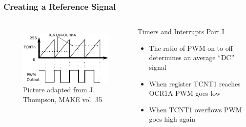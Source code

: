 \documentclass{beamer}
\begin{document}
\begin{frame}
\frametitle{Creating a Reference Signal}
\begin{columns}[t]
	\column[c]{6cm}
	\begin{figure}
	    \includegraphics[scale=1.25]{Bitbang}\\
	    \tiny{ Picture adapted from J. Thompson, MAKE vol. 35}
	    \end{figure}
	    
	\column[c]{5cm}

	\begin{block}{Timers and Interrupts Part I}
	\begin{itemize}
	\item {The ratio of PWM on to off determines an average ``DC'' signal}
	\item{When register TCNT1 reaches OCR1A PWM goes low}
	\item {When TCNT1 overflows PWM goes high again}
	\end{itemize}
	
	\end{block}
\end{columns}
\end{frame}
\end{document}
